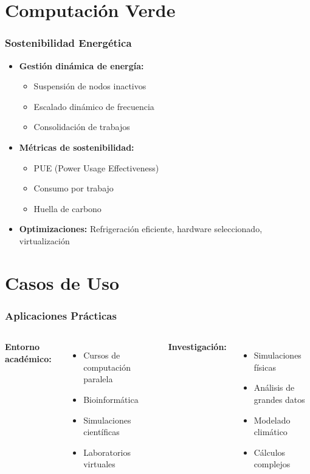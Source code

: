 \documentclass[aspectratio=169]{beamer}
\begin{document}
\section{Computación Verde}

\begin{frame}
\frametitle{Sostenibilidad Energética}
\begin{itemize}
    \item \textbf{Gestión dinámica de energía:}
    \begin{itemize}
        \item Suspensión de nodos inactivos
        \item Escalado dinámico de frecuencia
        \item Consolidación de trabajos
    \end{itemize}
    \item \textbf{Métricas de sostenibilidad:}
    \begin{itemize}
        \item PUE (Power Usage Effectiveness)
        \item Consumo por trabajo
        \item Huella de carbono
    \end{itemize}
    \item \textbf{Optimizaciones:} Refrigeración eficiente, hardware seleccionado, virtualización
\end{itemize}
\end{frame}

\section{Casos de Uso}

\begin{frame}
\frametitle{Aplicaciones Prácticas}
\begin{columns}
\textbf{Entorno académico:}
\begin{itemize}
    \item Cursos de computación paralela
    \item Bioinformática
    \item Simulaciones científicas
    \item Laboratorios virtuales
\end{itemize}

\textbf{Investigación:}
\begin{itemize}
    \item Simulaciones físicas
    \item Análisis de grandes datos
    \item Modelado climático
    \item Cálculos complejos
\end{itemize}
\end{columns}
\end{frame}
\end{document}
